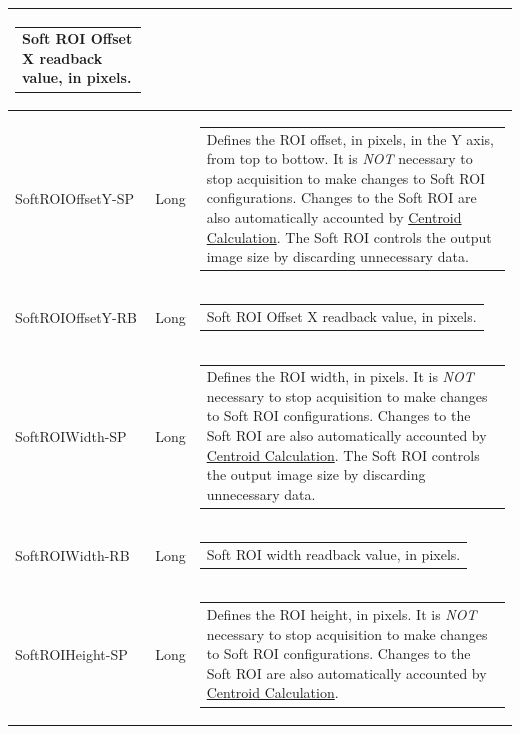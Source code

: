 \documentclass[openany]{article}
\begin{document}
\begin{longtable}{| m{3.0cm} m{4.5cm}  m{7.0cm} |}
\begin{tabular}{@{}m{6cm}@{}}
                Soft ROI Offset X readback value, in pixels.
            \end{tabular} \hypertarget{pv:soft-roi-off-y}{}\\ \hline
        SoftROIOffsetY-SP & Long & \begin{tabular}{@{}m{6cm}@{}}
                Defines the ROI offset, in pixels, in the Y axis, from top to bottow.
                It is \emph{NOT} necessary to stop acquisition to make changes to Soft ROI 
                configurations. Changes to the Soft ROI are also automatically accounted by
                \hyperref[sec:centroid-calc]{Centroid Calculation}.
                The Soft ROI controls the output image size by discarding unnecessary data.
            \end{tabular} \\ \hline
        SoftROIOffsetY-RB & Long & \begin{tabular}{@{}m{6cm}@{}}
                Soft ROI Offset X readback value, in pixels.
            \end{tabular} \hypertarget{pv:soft-roi-width}{}\\ \hline
        SoftROIWidth-SP & Long & \begin{tabular}{@{}m{6cm}@{}}
                Defines the ROI width, in pixels. It is \emph{NOT} necessary to stop
                acquisition to make changes to Soft ROI configurations. Changes to the
                Soft ROI are also automatically accounted by 
                \hyperref[sec:centroid-calc]{Centroid Calculation}.
                The Soft ROI controls the output image size by discarding unnecessary data.
            \end{tabular} \\ \hline
        SoftROIWidth-RB & Long & \begin{tabular}{@{}m{6cm}@{}}
                Soft ROI width readback value, in pixels.
            \end{tabular} \hypertarget{pv:soft-roi-height}{}\\ \hline
        SoftROIHeight-SP & Long & \begin{tabular}{@{}m{6cm}@{}}
                Defines the ROI height, in pixels. It is \emph{NOT} necessary to stop
                acquisition to make changes to Soft ROI configurations. Changes to the
                Soft ROI are also automatically accounted by 
                \hyperref[sec:centroid-calc]{Centroid Calculation}.

\end{tabular}
\end{longtable}
\end{document}
